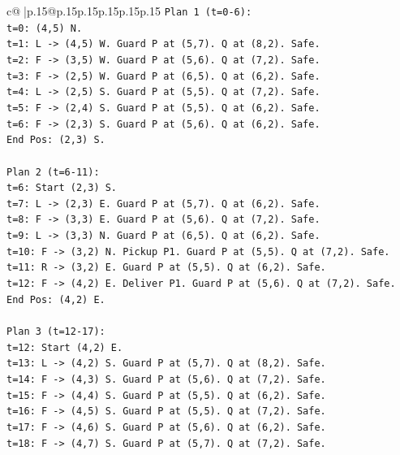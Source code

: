 \documentclass{article}
\begin{document}
{\begin{supertabular}{c@{$\;$}|p{.15\linewidth}@{}p{.15\linewidth}p{.15\linewidth}p{.15\linewidth}p{.15\linewidth}p{.15\linewidth}}
{{{\texttt{Plan 1 (t=0{-}6):} \\
\texttt{t=0: (4,5) N.} \\
\texttt{t=1: L {-}> (4,5) W. Guard P at (5,7). Q at (8,2). Safe.} \\
\texttt{t=2: F {-}> (3,5) W. Guard P at (5,6). Q at (7,2). Safe.} \\
\texttt{t=3: F {-}> (2,5) W. Guard P at (6,5). Q at (6,2). Safe.} \\
\texttt{t=4: L {-}> (2,5) S. Guard P at (5,5). Q at (7,2). Safe.} \\
\texttt{t=5: F {-}> (2,4) S. Guard P at (5,5). Q at (6,2). Safe.} \\
\texttt{t=6: F {-}> (2,3) S. Guard P at (5,6). Q at (6,2). Safe.} \\
\texttt{End Pos: (2,3) S.} \\
\\ 
\texttt{Plan 2 (t=6{-}11):} \\
\texttt{t=6: Start (2,3) S.} \\
\texttt{t=7: L {-}> (2,3) E. Guard P at (5,7). Q at (6,2). Safe.} \\
\texttt{t=8: F {-}> (3,3) E. Guard P at (5,6). Q at (7,2). Safe.} \\
\texttt{t=9: L {-}> (3,3) N. Guard P at (6,5). Q at (6,2). Safe.} \\
\texttt{t=10: F {-}> (3,2) N. Pickup P1. Guard P at (5,5). Q at (7,2). Safe.} \\
\texttt{t=11: R {-}> (3,2) E. Guard P at (5,5). Q at (6,2). Safe.} \\
\texttt{t=12: F {-}> (4,2) E. Deliver P1. Guard P at (5,6). Q at (7,2). Safe.} \\
\texttt{End Pos: (4,2) E.} \\
\\ 
\texttt{Plan 3 (t=12{-}17):} \\
\texttt{t=12: Start (4,2) E.} \\
\texttt{t=13: L {-}> (4,2) S. Guard P at (5,7). Q at (8,2). Safe.} \\
\texttt{t=14: F {-}> (4,3) S. Guard P at (5,6). Q at (7,2). Safe.} \\
\texttt{t=15: F {-}> (4,4) S. Guard P at (5,5). Q at (6,2). Safe.} \\
\texttt{t=16: F {-}> (4,5) S. Guard P at (5,5). Q at (7,2). Safe.} \\
\texttt{t=17: F {-}> (4,6) S. Guard P at (5,6). Q at (6,2). Safe.} \\
\texttt{t=18: F {-}> (4,7) S. Guard P at (5,7). Q at (7,2). Safe.} \\
}}}
\end{supertabular}}
\end{document}

